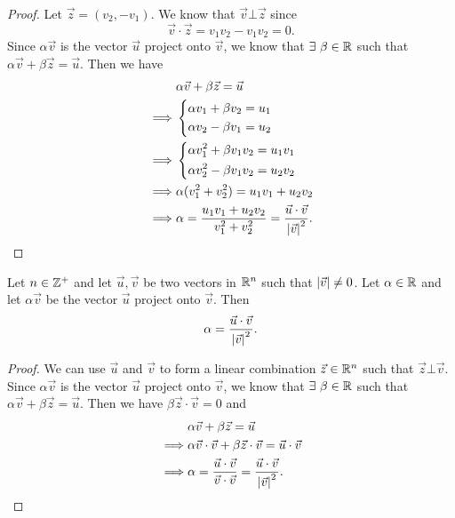 \begin{proof}
  Let \(\vec{z} = (v_2, -v_1)\).
  We know that \(\vec{v} \bot \vec{z}\) since
  \[
    \vec{v} \cdot \vec{z} = v_1 v_2 - v_1 v_2 = 0.
  \]
  Since \(\alpha \vec{v}\) is the vector \(\vec{u}\) project onto \(\vec{v}\), we know that \(\exists\ \beta \in \mathbb{R}\) such that \(\alpha \vec{v} + \beta \vec{z} = \vec{u}\).
  Then we have
  \begin{align*}
             & \alpha \vec{v} + \beta \vec{z} = \vec{u}                                                            \\
    \implies & \begin{dcases}
                 \alpha v_1 + \beta v_2 = u_1 \\
                 \alpha v_2 - \beta v_1 = u_2
               \end{dcases}                                                                        \\
    \implies & \begin{dcases}
                 \alpha v_1^2 + \beta v_1 v_2 = u_1 v_1 \\
                 \alpha v_2^2 - \beta v_1 v_2 = u_2 v_2
               \end{dcases}                                                              \\
    \implies & \alpha (v_1^2 + v_2^2) = u_1 v_1 + u_2 v_2                                                          \\
    \implies & \alpha = \dfrac{u_1 v_1 + u_2 v_2}{v_1^2 + v_2^2} = \dfrac{\vec{u} \cdot \vec{v}}{\left\lvert\vec{v}\right\rvert^2}.
  \end{align*}
\end{proof}

\begin{ac}\label{ac:1.1.2}
  Let \(n \in \mathbb{Z}^+\) and let \(\vec{u}, \vec{v}\) be two vectors in \(\mathbb{R}^n\) such that \(\left\lvert\vec{v}\right\rvert \neq 0\).
  Let \(\alpha \in \mathbb{R}\) and let \(\alpha \vec{v}\) be the vector \(\vec{u}\) project onto \(\vec{v}\).
  Then
  \[
    \alpha = \dfrac{\vec{u} \cdot \vec{v}}{\left\lvert\vec{v}\right\rvert^2}.
  \]
\end{ac}

\begin{proof}
  We can use \(\vec{u}\) and \(\vec{v}\) to form a linear combination \(\vec{z} \in \mathbb{R}^n\) such that \(\vec{z} \bot \vec{v}\).
  Since \(\alpha \vec{v}\) is the vector \(\vec{u}\) project onto \(\vec{v}\), we know that \(\exists\ \beta \in \mathbb{R}\) such that \(\alpha \vec{v} + \beta \vec{z} = \vec{u}\).
  Then we have \(\beta \vec{z} \cdot \vec{v} = 0\) and
  \begin{align*}
             & \alpha \vec{v} + \beta \vec{z} = \vec{u}                                                                        \\
    \implies & \alpha \vec{v} \cdot \vec{v} + \beta \vec{z} \cdot \vec{v} = \vec{u} \cdot \vec{v}                              \\
    \implies & \alpha = \dfrac{\vec{u} \cdot \vec{v}}{\vec{v} \cdot \vec{v}} = \dfrac{\vec{u} \cdot \vec{v}}{\left\lvert\vec{v}\right\rvert^2}.
  \end{align*}
\end{proof}

